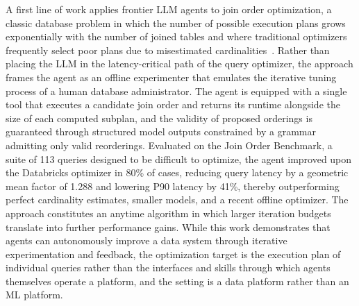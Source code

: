 \documentclass[
english,                 %
bibtex,                  %
]{kththesis}
\numberwithin{listing}{chapter}
\begin{document}
A first line of work applies frontier \gls{LLM} agents to join order optimization, a classic database problem in which the number of possible execution plans grows exponentially with the number of joined tables and where traditional optimizers frequently select poor plans due to misestimated cardinalities~\cite{liang_are_2026}. Rather than placing the \gls{LLM} in the latency-critical path of the query optimizer, the approach frames the agent as an offline experimenter that emulates the iterative tuning process of a human database administrator. The agent is equipped with a single tool that executes a candidate join order and returns its runtime alongside the size of each computed subplan, and the validity of proposed orderings is guaranteed through structured model outputs constrained by a grammar admitting only valid reorderings. Evaluated on the Join Order Benchmark, a suite of 113 queries designed to be difficult to optimize, the agent improved upon the Databricks optimizer in 80\% of cases, reducing query latency by a geometric mean factor of 1.288 and lowering P90 latency by 41\%, thereby outperforming perfect cardinality estimates, smaller models, and a recent offline optimizer. The approach constitutes an anytime algorithm in which larger iteration budgets translate into further performance gains. While this work demonstrates that agents can autonomously improve a data system through iterative experimentation and feedback, the optimization target is the execution plan of individual queries rather than the interfaces and skills through which agents themselves operate a platform, and the setting is a data platform rather than an \gls{ML} platform.
\end{document}
